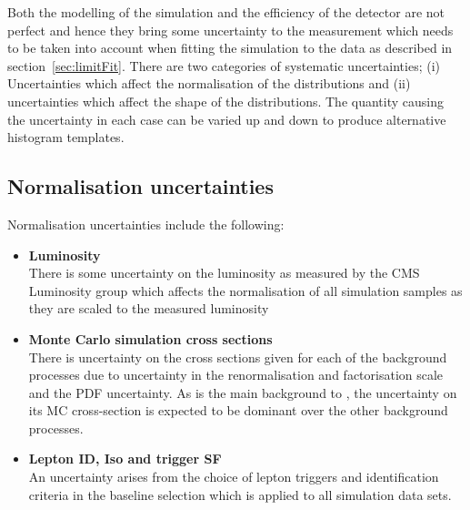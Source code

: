 Both the modelling of the simulation and the efficiency of the detector are not perfect and hence they bring some uncertainty to the measurement which needs to be taken into account when fitting the simulation to the data as described in section~\ref{sec:limitFit}.
There are two categories of systematic uncertainties; (i) Uncertainties which affect the normalisation of the distributions and (ii) uncertainties which affect the shape of the distributions. The quantity causing the uncertainty in each case can be varied up and down to produce alternative histogram templates.

\subsection{Normalisation uncertainties}
Normalisation uncertainties include the following:
\begin{itemize}
\item \textbf{Luminosity}\\
There is some uncertainty on the luminosity as measured by the CMS Luminosity group which affects the normalisation of all simulation samples as they are scaled to the measured luminosity

\item \textbf{Monte Carlo simulation cross sections}\\
There is uncertainty on the cross sections given for each of the background processes due to uncertainty in the renormalisation and factorisation scale and the PDF uncertainty. As \ttbar is the main background to \tttt, the uncertainty on its MC cross-section is expected to be dominant over the other background processes. 

\item \textbf{Lepton ID, Iso and trigger SF}\\
An uncertainty arises from the choice of lepton triggers and identification criteria in the baseline selection which is applied to all simulation data sets.

\end{itemize}

